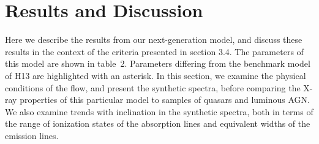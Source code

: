 \documentclass[useAMS,usenatbib]{mn2e_x}
\begin{document}




\section{Results and Discussion}



Here we describe the results from our next-generation model,
and discuss these results in the context of the criteria 
presented in section 3.4. The parameters of this model are shown in table~2.
Parameters differing from the benchmark model of H13 are 
highlighted with an asterisk. In this section, we examine the physical 
conditions of the flow, and present the synthetic spectra, before comparing
the X-ray properties of this particular model to samples of
quasars and luminous AGN. We also examine trends with inclination in the synthetic spectra, 
both in terms of the range of ionization states of the absorption lines and equivalent widths 
of the emission lines.

\end{document}
